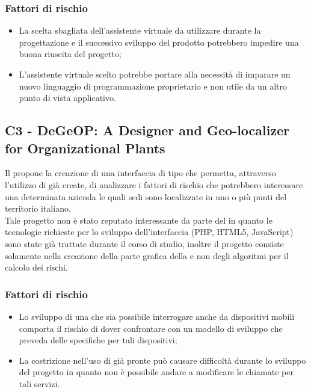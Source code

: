 \subsubsection{Fattori di rischio}
\begin{itemize}
	\item La scelta sbagliata dell'assistente virtuale da utilizzare durante la progettazione e il successivo sviluppo del prodotto potrebbero impedire una buona riuscita del progetto;
	\item L'assistente virtuale scelto potrebbe portare alla necessità di imparare un nuovo linguaggio di programmazione proprietario e non utile da un altro punto di vista applicativo.
\end{itemize}

\subsection{C3 - DeGeOP: A Designer and Geo-localizer  for Organizational Plants}
Il  propone la creazione di una interfaccia di tipo  che permetta, attraverso l'utilizzo di  già create, di analizzare i fattori di rischio che potrebbero interessare una determinata azienda le quali sedi sono localizzate in uno o più punti del territorio italiano. \\
Tale progetto non è stato reputato interessante da parte del  in quanto le tecnologie richieste per lo sviluppo dell'interfaccia (PHP, HTML5, JavaScript) sono state già trattate durante il corso di studio, inoltre il progetto consiste solamente nella creazione della parte grafica della  e non degli algoritmi per il calcolo dei rischi.

\subsubsection{Fattori di rischio}
\begin{itemize}
	\item Lo sviluppo di una  che sia possibile interrogare anche da dispositivi mobili comporta il rischio di dover confrontare con un modello di sviluppo che preveda delle  specifiche per tali dispositivi;
	\item La costrizione nell'uso di  già pronte può causare difficoltà durante lo sviluppo del progetto in quanto non è possibile andare a modificare le chiamate per tali servizi.
\end{itemize}

